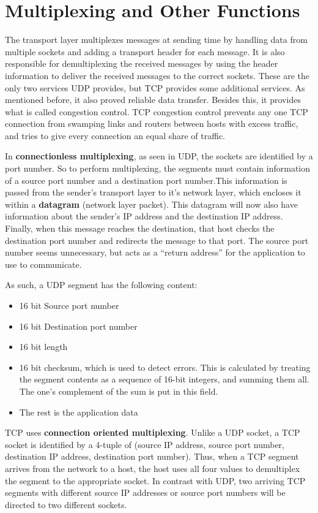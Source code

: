 \documentclass[12pt,letterpaper]{amsbook}
\theoremstyle{definition}
\begin{document}
\section{Multiplexing and Other Functions}

The transport layer multiplexes messages at sending time by handling data from multiple sockets and adding a transport header for each message. It is also responsible for demultiplexing the received messages by using the header information to deliver the received messages to the correct sockets. These are the only two services UDP provides, but TCP provides some additional services. As mentioned before, it also proved reliable data transfer. Besides this, it provides what is called congestion control. TCP congestion control prevents any one TCP connection from swamping links and routers between hosts with excess traffic, and tries to give every connection an equal share of traffic.

In \textbf{connectionless multiplexing}, as seen in UDP, the sockets are identified by a port number. So to perform multiplexing, the segments must contain information of a source port number and a destination port number.This information is passed from the sender's transport layer to it's network layer, which encloses it within a \textbf{datagram}  (network layer packet). This datagram will now also have information about the sender's IP address and the destination IP address. Finally, when this message reaches the destination, that host checks the destination port number and redirects the message to that port. The source port number seems unnecessary, but acts as a ``return address'' for the application to use to communicate.

As such, a UDP segment has the following content:

\begin{itemize}
  \item 16 bit Source port number
  \item 16 bit Destination port number
  \item 16 bit length
  \item 16 bit checksum, which is used to detect errors. This is calculated by treating the segment contents as a sequence of 16-bit integers, and summing them all. The one's complement of the sum is put in this field.
  \item The rest is the application data
\end{itemize}

TCP uses \textbf{connection oriented multiplexing}. Unlike a UDP socket, a TCP socket is identified by a 4-tuple of (source IP address, source port number, destination IP address, destination port number). Thus, when a TCP segment arrives from the network to a host, the host uses all four values to demultiplex the segment to the appropriate socket. In contrast with UDP, two arriving TCP segments with different source IP addresses or source port numbers will be directed to two different sockets.
\end{document}
